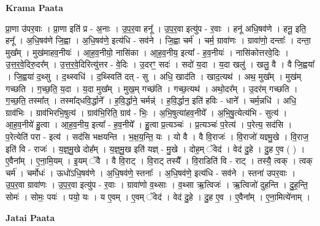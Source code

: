 \documentclass[17pt]{extarticle}
\begin{document}
\textbf{Krama Paata} \newline

प्रा॒णा उ॑पर॒वाः । प्रा॒णा इति॑ प्र - अ॒नाः । उ॒प॒र॒वा हनू᳚ । उ॒प॒र॒वा इत्यु॑प - र॒वाः । हनू॑ अधि॒षव॑णे । हनू॒ इति॒ हनू᳚ । अ॒धि॒षव॑णे जि॒ह्वा । अ॒धि॒षव॑णे॒ इत्य॑धि - सव॑ने । जि॒ह्वा चर्म॑ । चर्म॒ ग्रावा॑णः । ग्रावा॑णो॒ दन्ताः᳚ । दन्ता॒ मुख᳚म् । मुख॑माहव॒नीयः॑ । आ॒ह॒व॒नीयो॒ नासि॑का । आ॒ह॒व॒नीय॒ इत्या᳚ - ह॒व॒नीयः॑ । नासि॑कोत्तरवे॒दिः । उ॒त्त॒र॒वे॒दिरु॒दर᳚म् । उ॒त्त॒र॒वे॒दिरित्यु॑त्तर - वे॒दिः । उ॒दरꣳ॒॒ सदः॑ । सदो॑ य॒दा । य॒दा खलु॑ । खलु॒ वै । वै जि॒ह्वया᳚ । जि॒ह्वया॑ द॒थ्सु । द॒थ्स्वधि॑ । द॒थ्स्विति॑ दत् - सु । अधि॒ खाद॑ति । खाद॒त्यथ॑ । अथ॒ मुख᳚म् । मुख॑म् गच्छति । ग॒च्छ॒ति॒ य॒दा । य॒दा मुख᳚म् । मुख॒म् गच्छ॑ति । गच्छ॒त्यथ॑ । अथो॒दर᳚म् । उ॒दर॑म् गच्छति । ग॒च्छ॒ति॒ तस्मा᳚त् । तस्मा᳚द्‍धवि॒र्द्धाने᳚ । ह॒वि॒र्द्धाने॒ चर्मन्न्॑ । ह॒वि॒र्द्धान॒ इति॑ हविः - धाने᳚ । चर्म॒न्नधि॑ । अधि॒ ग्राव॑भिः । ग्राव॑भिरभि॒षुत्य॑ । ग्राव॑भि॒रिति॒ ग्राव॑ - भिः॒ । अ॒भि॒षुत्या॑हव॒नीये᳚ । अ॒भि॒षु॒त्येत्य॑भि - सुत्य॑ । आ॒ह॒व॒नीये॑ हु॒त्वा । आ॒ह॒व॒नीय॒ इत्या᳚ - ह॒व॒नीये᳚ । हु॒त्वा प्र॒त्यञ्चः॑ । प्र॒त्यञ्चः॑ प॒रेत्य॑ । प॒रेत्य॒ सद॑सि । प॒रेत्येति॑ परा - इत्य॑ । सद॑सि भक्षयन्ति । भ॒क्ष॒य॒न्ति॒ यः । यो वै । वै वि॒राजः॑ । वि॒राजो॑ यज्ञ्मु॒खे । वि॒राज॒ इति॑ वि - राजः॑ । य॒ज्ञ्॒मु॒खे दोह᳚म् । य॒ज्ञ्॒मु॒ख इति॑ यज्ञ् - मु॒खे । दोह॒म् ॅवेद॑ । वेद॑ दु॒हे । दु॒ह ए॒व ( ) । ए॒वैना᳚म् । ए॒ना॒मि॒यम् । इ॒यम् ॅवै । वै वि॒राट् । वि॒राट् तस्यै᳚ । वि॒राडिति॑ वि - राट् । तस्यै॒ त्वक् । त्वक् चर्म॑ । चर्मोधः॑ । ऊधो॑ऽधि॒षव॑णे । अ॒धि॒षव॑णे॒ स्तनाः᳚ । अ॒धि॒षव॑णे॒ इत्य॑धि - सव॑ने । स्तना॑ उपर॒वाः । उ॒प॒र॒वा ग्रावा॑णः । उ॒प॒र॒वा इत्यु॑प - र॒वाः । ग्रावा॑णो व॒थ्साः । व॒थ्सा ऋ॒त्विजः॑ । ऋ॒त्विजो॑ दुहन्ति । दु॒ह॒न्ति॒ सोमः॑ । सोमः॒ पयः॑ । पयो॒ यः । य ए॒वम् । ए॒वम् ॅवेद॑ । वेद॑ दु॒हे । दु॒ह ए॒व । ए॒वैना᳚म् । ए॒ना॒मित्ये॑नाम् । \newline

\textbf{Jatai Paata} \newline
\end{document}
